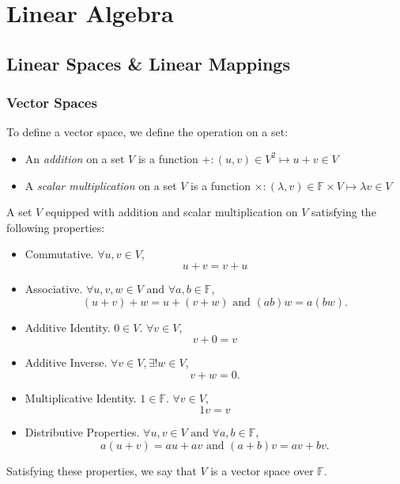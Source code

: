 \section{Linear Algebra}
\subsection{Linear Spaces \& Linear Mappings}
\subsubsection{Vector Spaces}
\begin{definition}
  To define a vector space, we define the operation on a set:
  \begin{itemize}
    \item An \emph{addition} on a set $V$ is a function $+:(u,v)\in V^2 \mapsto u+v\in V$ 
    \item A \emph{scalar multiplication} on a set $V$ is a function $\times:
      (\lambda,v)\in \mathbb{F}\times V \mapsto \lambda v\in V$
  \end{itemize}
\end{definition}
\begin{definition}
  A set $V$ equipped with addition and scalar multiplication on $V$ satisfying
  the following properties:
  \begin{itemize}
    \item Commutative. $\forall u,v\in V$,\[
      u+v=v+u\]
    \item Associative. $\forall u,v,w\in V\text{ and }\forall a,b\in \mathbb{F}$,\[
        (u+v)+w=u+(v+w)\text{ and }(ab)w=a(bw).\] 
    \item Additive Identity. $0\in V$. $\forall v\in V$,\[
        v+0=v\] 
    \item Additive Inverse. $\forall v\in V, \exists\mathpunct{!}w\in V$,
      \[v+w=0.\] 
    \item Multiplicative Identity. $1\in \mathbb{F}$. $\forall v\in V$,\[
        1v=v\] 
    \item Distributive Properties.
      $\forall u,v\in V\text{ and }\forall a,b\in\mathbb{F}$,
      \[a(u+v)=au+av\text{ and }(a+b)v=av+bv.\] 
  \end{itemize}
  Satisfying these properties, we say that $V$ is a vector space over $\mathbb{F}$.
\end{definition}

